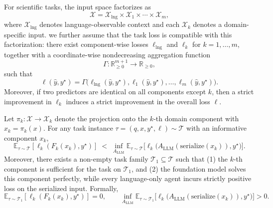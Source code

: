 \documentclass{llmxive}
\begin{document}
{\begin{assumption}
\label{assumption:task_factorization}
For scientific tasks, the input space factorizes as
\begin{equation}
    \mathcal{X} = \mathcal{X}_{\mathrm{lng}} \times \mathcal{X}_{1} \times \cdots \times \mathcal{X}_{m},
\end{equation}
where $\mathcal{X}_{\mathrm{lng}}$ denotes language-observable context and each $\mathcal{X}_k$ denotes a domain-specific input.
we further assume that the task loss is compatible with this factorization: there exist component-wise losses $\ell_{\mathrm{lng}}$ and $\ell_k$ for $k=1,\dots,m$, together with a coordinate-wise nondecreasing aggregation function
\begin{equation}
\Gamma:\mathbb{R}_{\ge 0}^{m+1}\to\mathbb{R}_{\ge 0},
\end{equation}
such that
\begin{equation}
    \ell(\hat y,y^\star)
    =
    \Gamma\!\big(\ell_{\mathrm{lng}}(\hat y,y^\star), \ell_1(\hat y,y^\star), \dots, \ell_m(\hat y,y^\star)\big).
\end{equation}
Moreover, if two predictors are identical on all components except $k$, then a strict improvement in $\ell_k$ induces a strict improvement in the overall loss $\ell$.
\end{assumption}

\begin{assumption}
\label{assumption:domain_advantage_app}
Let $\pi_k:\mathcal{X}\to\mathcal{X}_k$ denote the projection onto the $k$-th domain component with $x_k=\pi_k(x)$. For any task instance $\tau=(q,x,y^\star,\ell)\sim\mathcal{T}$ with an informative component $x_k$,
\begin{equation}
\mathbb{E}_{\tau\sim\mathcal{T}}[\ell_k(F_k(x_k),y^\star)]
\;<\;
\inf_{A_{\mathrm{LLM}}}\mathbb{E}_{\tau\sim\mathcal{T}}\big[\ell_k\big(A_{\mathrm{LLM}}(\mathrm{serialize}(x_k)),y^\star\big)\big].
\end{equation}
Moreover, there exists a non-empty task family $\mathcal{T}_1\subseteq\mathcal{T}$ such that (1) the $k$-th component is sufficient for the task on $\mathcal{T}_1$, and (2) the foundation model solves this component perfectly, while every language-only agent incurs strictly positive loss on the serialized input. Formally,
\begin{equation}
\mathbb{E}_{\tau\sim\mathcal{T}_1}[\ell_k(F_k(x_k),y^\star)] = 0,
\qquad
\inf_{A_{\mathrm{LLM}}}
\mathbb{E}_{\tau\sim\mathcal{T}_1}
\big[\ell_k\big(A_{\mathrm{LLM}}(\mathrm{serialize}(x_k)),y^\star\big)\big] > 0.
\end{equation}
\end{assumption}

}
\end{document}
